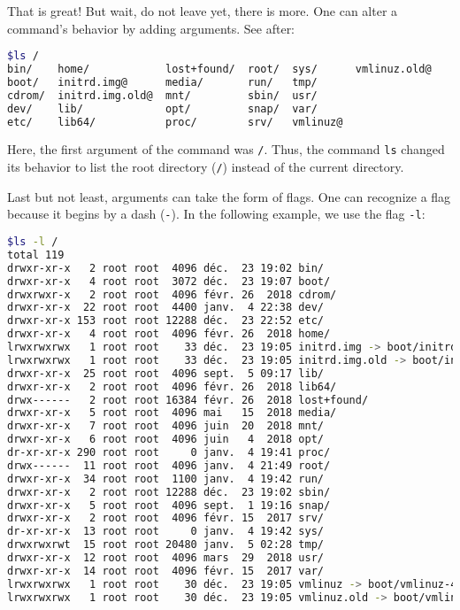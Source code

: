 \documentclass[12pt]{article}
\begin{document}
That is great! But wait, do not leave yet, there is more. One can alter a command's behavior by adding arguments. See after:
\begin{lstlisting}[language=bash,breaklines=true]
$ls /
bin/    home/            lost+found/  root/  sys/      vmlinuz.old@
boot/   initrd.img@      media/       run/   tmp/
cdrom/  initrd.img.old@  mnt/         sbin/  usr/
dev/    lib/             opt/         snap/  var/
etc/    lib64/           proc/        srv/   vmlinuz@
\end{lstlisting}

Here, the first argument of the command was \texttt{/}. Thus, the command \texttt{ls} changed its behavior to list the root directory (\texttt{/}) instead of the current directory.

Last but not least, arguments can take the form of flags. One can recognize a flag because it begins by a dash (\texttt{-}). In the following example, we use the flag \texttt{-l}:

\begin{lstlisting}[language=bash]
$ls -l /
total 119
drwxr-xr-x   2 root root  4096 déc.  23 19:02 bin/
drwxr-xr-x   4 root root  3072 déc.  23 19:07 boot/
drwxrwxr-x   2 root root  4096 févr. 26  2018 cdrom/
drwxr-xr-x  22 root root  4400 janv.  4 22:38 dev/
drwxr-xr-x 153 root root 12288 déc.  23 22:52 etc/
drwxr-xr-x   4 root root  4096 févr. 26  2018 home/
lrwxrwxrwx   1 root root    33 déc.  23 19:05 initrd.img -> boot/initrd.img-4.15.0-43-generic
lrwxrwxrwx   1 root root    33 déc.  23 19:05 initrd.img.old -> boot/initrd.img-4.15.0-33-generic
drwxr-xr-x  25 root root  4096 sept.  5 09:17 lib/
drwxr-xr-x   2 root root  4096 févr. 26  2018 lib64/
drwx------   2 root root 16384 févr. 26  2018 lost+found/
drwxr-xr-x   5 root root  4096 mai   15  2018 media/
drwxr-xr-x   7 root root  4096 juin  20  2018 mnt/
drwxr-xr-x   6 root root  4096 juin   4  2018 opt/
dr-xr-xr-x 290 root root     0 janv.  4 19:41 proc/
drwx------  11 root root  4096 janv.  4 21:49 root/
drwxr-xr-x  34 root root  1100 janv.  4 19:42 run/
drwxr-xr-x   2 root root 12288 déc.  23 19:02 sbin/
drwxr-xr-x   5 root root  4096 sept.  1 19:16 snap/
drwxr-xr-x   2 root root  4096 févr. 15  2017 srv/
dr-xr-xr-x  13 root root     0 janv.  4 19:42 sys/
drwxrwxrwt  15 root root 20480 janv.  5 02:28 tmp/
drwxr-xr-x  12 root root  4096 mars  29  2018 usr/
drwxr-xr-x  14 root root  4096 févr. 15  2017 var/
lrwxrwxrwx   1 root root    30 déc.  23 19:05 vmlinuz -> boot/vmlinuz-4.15.0-43-generic
lrwxrwxrwx   1 root root    30 déc.  23 19:05 vmlinuz.old -> boot/vmlinuz-4.15.0-33-generic
\end{lstlisting}
\end{document}
